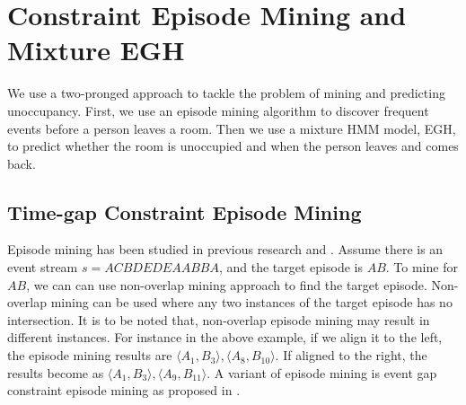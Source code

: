\section{Constraint Episode Mining and Mixture EGH}
We use a two-pronged approach to tackle the problem of mining and predicting unoccupancy.
First, we use an episode mining algorithm to discover frequent events before a person leaves 
a room. Then we use a mixture HMM model, EGH, to predict whether the room is unoccupied
and when the person leaves and comes back. 

\subsection{Time-gap Constraint Episode Mining}
Episode mining has been studied in previous research \cite{mannila1997discovery} 
and \cite{laxman2005discovering}. 
Assume there is an event stream $s=ACBDEDEAABBA$, 
and the target episode is $AB$. To mine for $AB$, we can can use non-overlap mining approach to find the target episode. 
Non-overlap mining can be used where any two instances of the target episode has no intersection. It is to be noted that, non-overlap episode mining may result in different instances. 
For instance in the above example, if we align it to the left,  the episode mining results are $\langle A_1, B_3 \rangle, \langle A_8,B_{10} \rangle$. If aligned to the right, the results become as $\langle A_1, B_3 \rangle, \langle A_9,B_{11} \rangle$. 
A variant of episode mining is event gap constraint episode mining as proposed in
\cite{patnaik2008inferring}. 


